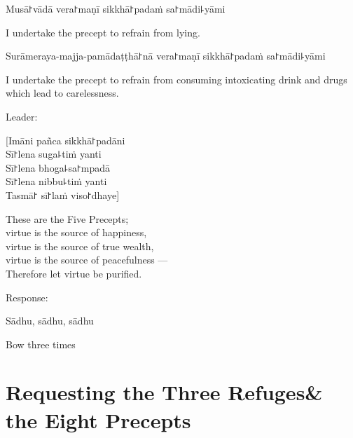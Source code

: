 \clearpage

\begin{precept}
  \setcounter{enumi}{3}
  \item Musā꜓vādā vera꜓maṇī sikkhā꜓padaṁ sa꜓mādi꜕yāmi
\end{precept}

\begin{english}
  I undertake the precept to refrain from lying.
\end{english}

\begin{precept}
  \setcounter{enumi}{4}
  \item Surāmeraya-majja-pamādaṭṭhā꜓nā vera꜓maṇī sikkhā꜓padaṁ sa꜓mādi꜕yāmi
\end{precept}

\begin{english}
  I undertake the precept to refrain from consuming intoxicating drink and drugs which lead to carelessness.
\end{english}

\begin{instruction}
  Leader:
\end{instruction}

[Imāni pañca sikkhā꜓padāni\\
Sī꜓lena suga꜕tiṁ yanti\\
Sī꜓lena bhoga꜕sa꜓mpadā\\
Sī꜓lena nibbu꜕tiṁ yanti\\
Tasmā꜓ sī꜓laṁ viso꜓dhaye]

\begin{english}
  These are the Five Precepts;\\
  virtue is the source of happiness,\\
  virtue is the source of true wealth,\\
  virtue is the source of peacefulness ---\\
  Therefore let virtue be purified.
\end{english}

\begin{instruction}
  Response:
\end{instruction}

Sādhu, sādhu, sādhu

\begin{instruction}
  Bow three times
\end{instruction}

\clearpage
\chapter[Three Refuges \& the Eight Precepts]{Requesting the Three Refuges\newline \& the Eight Precepts}%

